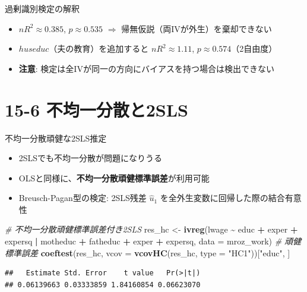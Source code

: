 \documentclass[
  ignorenonframetext,
]{beamer}
\newenvironment{Shaded}{\begin{snugshade}}{\end{snugshade}}
\newcommand{\AttributeTok}[1]{\textcolor[rgb]{0.13,0.29,0.53}{#1}}
\newcommand{\CommentTok}[1]{\textcolor[rgb]{0.56,0.35,0.01}{\textit{#1}}}
\newcommand{\FunctionTok}[1]{\textcolor[rgb]{0.13,0.29,0.53}{\textbf{#1}}}
\newcommand{\NormalTok}[1]{#1}
\newcommand{\OtherTok}[1]{\textcolor[rgb]{0.56,0.35,0.01}{#1}}
\newcommand{\SpecialCharTok}[1]{\textcolor[rgb]{0.81,0.36,0.00}{\textbf{#1}}}
\newcommand{\StringTok}[1]{\textcolor[rgb]{0.31,0.60,0.02}{#1}}
\providecommand{\tightlist}{%
  \setlength{\itemsep}{0pt}\setlength{\parskip}{0pt}}
\begin{document}
\begin{frame}{過剰識別検定の解釈}
\label{ux904eux5270ux8b58ux5225ux691cux5b9aux306eux89e3ux91c8}
\begin{itemize}
\tightlist
\item
  \(nR^2 \approx 0.385\), \(p \approx 0.535\) \(\Rightarrow\)
  帰無仮説（両IVが外生）を棄却できない
\item
  \(huseduc\)（夫の教育）を追加すると \(nR^2 \approx 1.11\),
  \(p \approx 0.574\)（2自由度）
\item
  \textbf{注意}:
  検定は全IVが同一の方向にバイアスを持つ場合は検出できない
\end{itemize}
\end{frame}

\section{15-6
不均一分散と2SLS}\label{ux4e0dux5747ux4e00ux5206ux6563ux30682sls}

\begin{frame}[fragile]{不均一分散頑健な2SLS推定}
\label{ux4e0dux5747ux4e00ux5206ux6563ux9811ux5065ux306a2slsux63a8ux5b9a}
\begin{itemize}
\tightlist
\item
  2SLSでも不均一分散が問題になりうる
\item
  OLSと同様に、\textbf{不均一分散頑健標準誤差}が利用可能
\item
  Breusch-Pagan型の検定: 2SLS残差 \(\hat{u}_1\)
  を全外生変数に回帰した際の結合有意性
\end{itemize}

\scriptsize

\begin{Shaded}
\begin{Highlighting}[]
\CommentTok{\# 不均一分散頑健標準誤差付き2SLS}
\NormalTok{res\_hc }\OtherTok{\textless{}{-}} \FunctionTok{ivreg}\NormalTok{(lwage }\SpecialCharTok{\textasciitilde{}}\NormalTok{ educ }\SpecialCharTok{+}\NormalTok{ exper }\SpecialCharTok{+}\NormalTok{ expersq }\SpecialCharTok{|}
\NormalTok{                  motheduc }\SpecialCharTok{+}\NormalTok{ fatheduc }\SpecialCharTok{+}\NormalTok{ exper }\SpecialCharTok{+}\NormalTok{ expersq,}
                \AttributeTok{data =}\NormalTok{ mroz\_work)}
\CommentTok{\# 頑健標準誤差}
\FunctionTok{coeftest}\NormalTok{(res\_hc, }\AttributeTok{vcov =} \FunctionTok{vcovHC}\NormalTok{(res\_hc, }\AttributeTok{type =} \StringTok{"HC1"}\NormalTok{))[}\StringTok{"educ"}\NormalTok{, ]}
\end{Highlighting}
\end{Shaded}

\begin{verbatim}
##   Estimate Std. Error    t value   Pr(>|t|) 
## 0.06139663 0.03333859 1.84160854 0.06623070
\end{verbatim}

\normalsize
\end{frame}
\end{document}
